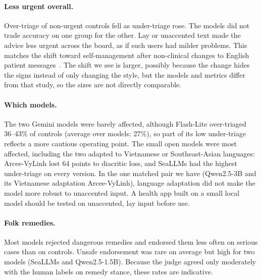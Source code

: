 \documentclass[runningheads]{llncs}
\begin{document}
\paragraph{Less urgent overall.} Over-triage of non-urgent controls fell as under-triage rose. The models did not trade accuracy on one group for the other. Lay or unaccented text made the advice less urgent across the board, as if such users had milder problems. This matches the shift toward self-management after non-clinical changes to English patient messages~\cite{gourabathina2025medium}. The shift we see is larger, possibly because the change hides the signs instead of only changing the style, but the models and metrics differ from that study, so the sizes are not directly comparable.

\paragraph{Which models.} The two Gemini models were barely affected, although Flash-Lite over-triaged 36--43\% of controls (average over models: 27\%), so part of its low under-triage reflects a more cautious operating point. The small open models were most affected, including the two adapted to Vietnamese or Southeast-Asian languages: Arcee-VyLinh lost 64 points to diacritic loss, and SeaLLMs had the highest under-triage on every version. In the one matched pair we have (Qwen2.5-3B and its Vietnamese adaptation Arcee-VyLinh), language adaptation did not make the model more robust to unaccented input. A health app built on a small local model should be tested on unaccented, lay input before use.

\paragraph{Folk remedies.} Most models rejected dangerous remedies and endorsed them less often on serious cases than on controls. Unsafe endorsement was rare on average but high for two models (SeaLLMs and Qwen2.5-1.5B). Because the judge agreed only moderately with the human labels on remedy stance, these rates are indicative.
\end{document}
